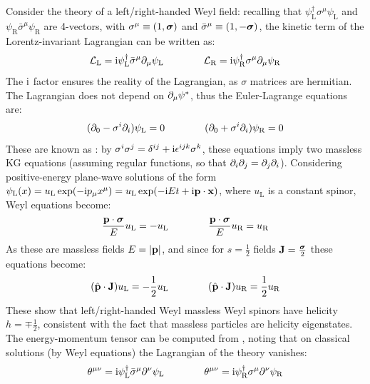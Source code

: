 Consider the theory of a left/right-handed Weyl field: recalling that $ \psi_\text{L}^\dagger \sigma^\mu \psi_\text{L} $ and $ \psi_\text{R} \bar{\sigma}^\mu \psi_\text{R} $ are 4-vectors, with $ \sigma^\mu \equiv (1, \boldsymbol{\sigma}) $ and $ \bar{\sigma}^\mu \equiv (1, - \boldsymbol{\sigma}) $, the kinetic term of the Lorentz-invariant Lagrangian can be written as:
\begin{equation}
  \mathcal{L}_\text{L} = \mathrm{i} \psi_\text{L}^\dagger \bar{\sigma}^\mu \partial_\mu \psi_\text{L}
  \qquad \qquad
  \mathcal{L}_\text{R} = \mathrm{i} \psi_\text{R}^\dagger \sigma^\mu \partial_\mu \psi_\text{R}
\end{equation}
The $ \mathrm{i} $ factor ensures the reality of the Lagrangian, as $ \sigma $ matrices are hermitian. The Lagrangian does not depend on $ \partial_\mu \psi^* $, thus the Euler-Lagrange equations are:
\begin{equation}
  (\partial_0 - \sigma^i \partial_i) \psi_\text{L} = 0
  \qquad \qquad
  (\partial_0 + \sigma^i \partial_i) \psi_\text{R} = 0
\end{equation}
These are known as : by $ \sigma^i \sigma^j = \delta^{ij} + \mathrm{i} \epsilon^{ijk} \sigma^k $, these equations imply two massless KG equations (assuming regular functions, so that $ \partial_i \partial_j = \partial_j \partial_i $). Considering positive-energy plane-wave solutions of the form $ \psi_\text{L}(x) = u_\text{L} \exp(-\mathrm{i} p_\mu x^\mu) = u_\text{L} \exp(-\mathrm{i} E t + \mathrm{i} \mathbf{p} \cdot \mathbf{x}) $, where $ u_\text{L} $ is a constant spinor, Weyl equations become:
\begin{equation*}
  \frac{\mathbf{p} \cdot \boldsymbol{\sigma}}{E} u_\text{L} = - u_\text{L}
  \qquad \qquad
  \frac{\mathbf{p} \cdot \boldsymbol{\sigma}}{E} u_\text{R} = u_\text{R}
\end{equation*}
As these are massless fields $ E = \left\lvert\mathbf{p}\right\rvert $, and since for $ s = \frac{1}{2} $ fields $ \mathbf{J} = \frac{\boldsymbol{\sigma}}{2} $ these equations become:
\begin{equation*}
  (\hat{\mathbf{p}} \cdot \mathbf{J}) u_\text{L} = - \frac{1}{2} u_\text{L}
  \qquad \qquad
  (\hat{\mathbf{p}} \cdot \mathbf{J}) u_\text{R} = \frac{1}{2} u_\text{R}
\end{equation*}
These show that left/right-handed Weyl massless Weyl spinors have helicity $ h = \mp \frac{1}{2} $, consistent with the fact that massless particles are helicity eigenstates.\\
The energy-momentum tensor can be computed from , noting that on classical solutions (by Weyl equations) the Lagrangian of the theory vanishes:
\begin{equation}
  \theta^{\mu \nu} = \mathrm{i} \psi_\text{L}^\dagger \bar{\sigma}^\mu \partial^\nu \psi_\text{L}
  \qquad \qquad
  \theta^{\mu \nu} = \mathrm{i} \psi_\text{R}^\dagger \sigma^\mu \partial^\nu \psi_\text{R}
\end{equation}
